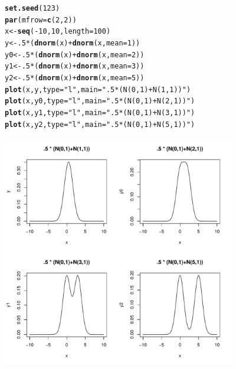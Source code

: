 \documentclass{article}\usepackage[]{graphicx}\usepackage[]{xcolor}
\makeatletter
\newcommand{\hlnum}[1]{\textcolor[rgb]{0.686,0.059,0.569}{#1}}%
\newcommand{\hlstr}[1]{\textcolor[rgb]{0.192,0.494,0.8}{#1}}%
\newcommand{\hlopt}[1]{\textcolor[rgb]{0,0,0}{#1}}%
\newcommand{\hlstd}[1]{\textcolor[rgb]{0.345,0.345,0.345}{#1}}%
\newcommand{\hlkwb}[1]{\textcolor[rgb]{0.69,0.353,0.396}{#1}}%
\newcommand{\hlkwc}[1]{\textcolor[rgb]{0.333,0.667,0.333}{#1}}%
\newcommand{\hlkwd}[1]{\textcolor[rgb]{0.737,0.353,0.396}{\textbf{#1}}}%
\newenvironment{kframe}{%
 \def\at@end@of@kframe{}%
 \ifinner\ifhmode%
  \def\at@end@of@kframe{\end{minipage}}%
  \begin{minipage}{\columnwidth}%
 \fi\fi%
 \def\FrameCommand##1{\hskip\@totalleftmargin \hskip-\fboxsep
 \colorbox{shadecolor}{##1}\hskip-\fboxsep
     \hskip-\linewidth \hskip-\@totalleftmargin \hskip\columnwidth}%
 \MakeFramed {\advance\hsize-\width
   \@totalleftmargin\z@ \linewidth\hsize
   \@setminipage}}%
 {\par\unskip\endMakeFramed%
 \at@end@of@kframe}
\newenvironment{knitrout}{}{} %
\theoremstyle{plain}
\theoremstyle{definition}
\theoremstyle{remark}
\makeatother
\begin{document}
\begin{minipage}{\linewidth}
\singlespacing
\begin{knitrout}
\color{fgcolor}\begin{kframe}
\begin{alltt}
\hlkwd{set.seed}\hlstd{(}\hlnum{123}\hlstd{)}
\hlkwd{par}\hlstd{(}\hlkwc{mfrow}\hlstd{=}\hlkwd{c}\hlstd{(}\hlnum{2}\hlstd{,}\hlnum{2}\hlstd{))}
\hlstd{x} \hlkwb{<-} \hlkwd{seq}\hlstd{(}\hlopt{-}\hlnum{10}\hlstd{,} \hlnum{10}\hlstd{,} \hlkwc{length}\hlstd{=}\hlnum{100}\hlstd{)}
\hlstd{y} \hlkwb{<-} \hlnum{.5} \hlopt{*} \hlstd{(}\hlkwd{dnorm}\hlstd{(x)} \hlopt{+} \hlkwd{dnorm}\hlstd{(x,} \hlkwc{mean}\hlstd{=}\hlnum{1}\hlstd{))}
\hlstd{y0} \hlkwb{<-} \hlnum{.5} \hlopt{*} \hlstd{(}\hlkwd{dnorm}\hlstd{(x)} \hlopt{+} \hlkwd{dnorm}\hlstd{(x,} \hlkwc{mean}\hlstd{=}\hlnum{2}\hlstd{))}
\hlstd{y1} \hlkwb{<-} \hlnum{.5} \hlopt{*} \hlstd{(}\hlkwd{dnorm}\hlstd{(x)} \hlopt{+} \hlkwd{dnorm}\hlstd{(x,} \hlkwc{mean}\hlstd{=}\hlnum{3}\hlstd{))}
\hlstd{y2} \hlkwb{<-} \hlnum{.5} \hlopt{*} \hlstd{(}\hlkwd{dnorm}\hlstd{(x)} \hlopt{+} \hlkwd{dnorm}\hlstd{(x,} \hlkwc{mean}\hlstd{=}\hlnum{5}\hlstd{))}
\hlkwd{plot}\hlstd{(x, y,} \hlkwc{type}\hlstd{=}\hlstr{"l"}\hlstd{,} \hlkwc{main}\hlstd{=}\hlstr{".5 * (N(0,1)+N(1,1))"}\hlstd{)}
\hlkwd{plot}\hlstd{(x, y0,} \hlkwc{type}\hlstd{=}\hlstr{"l"}\hlstd{,} \hlkwc{main}\hlstd{=}\hlstr{".5 * (N(0,1)+N(2,1))"}\hlstd{)}
\hlkwd{plot}\hlstd{(x, y1,} \hlkwc{type}\hlstd{=}\hlstr{"l"}\hlstd{,} \hlkwc{main}\hlstd{=}\hlstr{".5 * (N(0,1)+N(3,1))"}\hlstd{)}
\hlkwd{plot}\hlstd{(x, y2,} \hlkwc{type}\hlstd{=}\hlstr{"l"}\hlstd{,} \hlkwc{main}\hlstd{=}\hlstr{".5 * (N(0,1)+N(5,1))"}\hlstd{)}
\end{alltt}
\end{kframe}

{\centering \includegraphics[width=4in]{figure/myrcode0-1} 

}


\end{knitrout}
\end{minipage}
\end{document}
